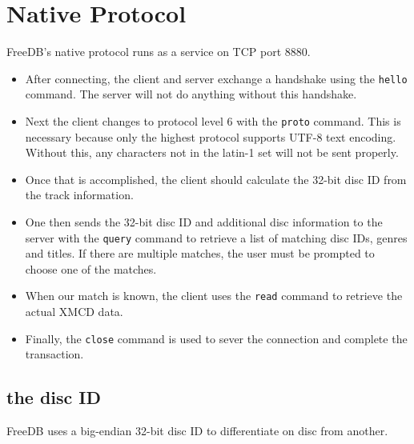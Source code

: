 \section{Native Protocol}
FreeDB's native protocol runs as a service on TCP port 8880.
\begin{itemize}
\item After connecting, the client and server exchange a handshake using
the \texttt{hello} command.
The server will not do anything without this handshake.

\item Next the client changes to protocol level 6 with
the \texttt{proto} command.
This is necessary because only the highest protocol supports
UTF-8 text encoding.
Without this, any characters not in the latin-1 set will not be
sent properly.

\item Once that is accomplished, the client should calculate the 32-bit
disc ID from the track information.

\item One then sends the 32-bit disc ID and additional disc information
to the server with the \texttt{query} command to retrieve a list of
matching disc IDs, genres and titles.
If there are multiple matches, the user must be prompted to
choose one of the matches.

\item When our match is known, the client uses the \texttt{read} command
to retrieve the actual XMCD data.

\item Finally, the \texttt{close} command is used to sever the connection
and complete the transaction.
\end{itemize}

\pagebreak

\subsection{the disc ID}
FreeDB uses a big-endian 32-bit disc ID to differentiate
on disc from another.

